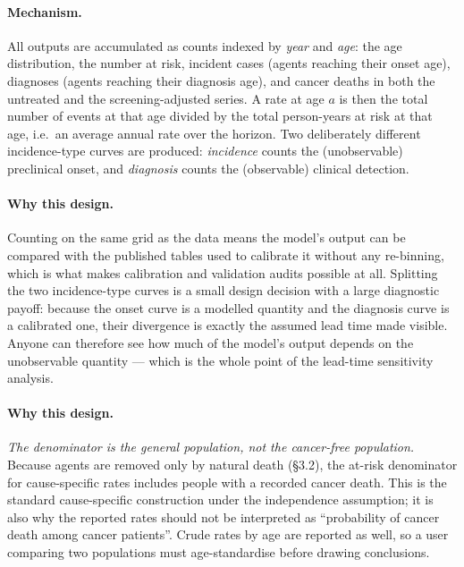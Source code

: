 \documentclass[12pt,a4paper]{article}
\newcommand{\mech}[1]{\paragraph{Mechanism.} #1}
\newcommand{\why}[1]{\paragraph{Why this design.} #1}
\begin{document}
\mech{All outputs are accumulated as counts indexed by \emph{year} and \emph{age}: the age distribution, the
number at risk, incident cases (agents reaching their onset age), diagnoses (agents reaching their diagnosis
age), and cancer deaths in both the untreated and the screening-adjusted series. A rate at age $a$ is then
the total number of events at that age divided by the total person-years at risk at that age, i.e.\ an
average annual rate over the horizon. Two deliberately different incidence-type curves are produced:
\emph{incidence} counts the (unobservable) preclinical onset, and \emph{diagnosis} counts the (observable)
clinical detection.}

\why{Counting on the same grid as the data means the model's output can be compared with the published tables
used to calibrate it without any re-binning, which is what makes calibration and validation audits possible
at all. Splitting the two incidence-type curves is a small design decision with a large diagnostic payoff:
because the onset curve is a modelled quantity and the diagnosis curve is a calibrated one, their divergence
is exactly the assumed lead time made visible. Anyone can therefore see how much of the model's output
depends on the unobservable quantity --- which is the whole point of the lead-time sensitivity analysis.}

\why{\emph{The denominator is the general population, not the cancer-free population.} Because agents are
removed only by natural death (\S3.2), the at-risk denominator for cause-specific rates includes people with
a recorded cancer death. This is the standard cause-specific construction under the independence assumption;
it is also why the reported rates should not be interpreted as ``probability of cancer death among cancer
patients''. Crude rates by age are reported as well, so a user comparing two populations must age-standardise
before drawing conclusions.}
\end{document}
